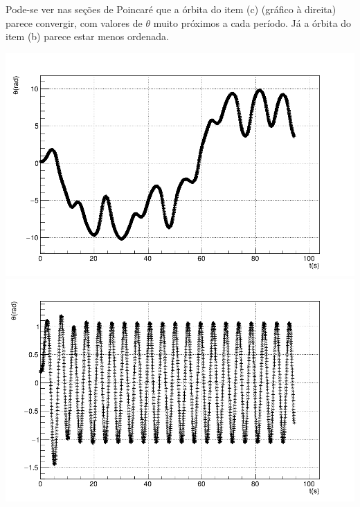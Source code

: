 \documentclass[main.tex]{subfiles}
\begin{document}
\begin{enumerate}[label=\textbf{\alph*)}]
    Pode-se ver nas seções de Poincaré que a órbita do item (c) (gráfico à direita) parece convergir, com valores de $\theta$ muito próximos a cada período. Já a órbita do item (b) parece estar menos ordenada.
    \begin{center}
        \includegraphics[scale=0.15]{../q2/alpha1.2/plots/theta_t_RK.png}
        \includegraphics[scale=0.15]{../q2/itemd/alpha1.2/plots/theta_t_RK.png}
    \end{center}
\end{enumerate}
\end{document}

